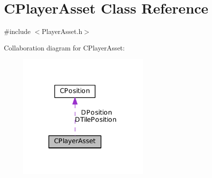 \hypertarget{classCPlayerAsset}{}\section{C\+Player\+Asset Class Reference}
\label{classCPlayerAsset}


{\ttfamily \#include $<$Player\+Asset.\+h$>$}



Collaboration diagram for C\+Player\+Asset\+:\nopagebreak
\begin{figure}[H]
\begin{center}
\leavevmode
\includegraphics[width=186pt]{classCPlayerAsset__coll__graph}
\end{center}
\end{figure}
